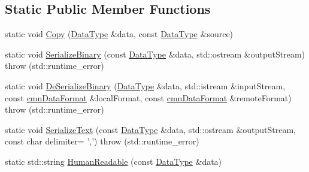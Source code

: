 \subsection*{Static Public Member Functions}
\begin{DoxyCompactItemize}
\item 
static void \hyperlink{classcmn_data_3_01vct_matrix_rotation3_3_01__element_type_00_01__row_major_01_4_01_4_ab8b28fb13fa4d47931f9d0d872275304}{Copy} (\hyperlink{classcmn_data_3_01vct_matrix_rotation3_3_01__element_type_00_01__row_major_01_4_01_4_a16ee28dba714864959664e5a1567db82}{Data\-Type} \&data, const \hyperlink{classcmn_data_3_01vct_matrix_rotation3_3_01__element_type_00_01__row_major_01_4_01_4_a16ee28dba714864959664e5a1567db82}{Data\-Type} \&source)
\item 
static void \hyperlink{classcmn_data_3_01vct_matrix_rotation3_3_01__element_type_00_01__row_major_01_4_01_4_a4e7912d305c127eeb3eab553b09a0c69}{Serialize\-Binary} (const \hyperlink{classcmn_data_3_01vct_matrix_rotation3_3_01__element_type_00_01__row_major_01_4_01_4_a16ee28dba714864959664e5a1567db82}{Data\-Type} \&data, std\-::ostream \&output\-Stream)  throw (std\-::runtime\-\_\-error)
\item 
static void \hyperlink{classcmn_data_3_01vct_matrix_rotation3_3_01__element_type_00_01__row_major_01_4_01_4_a61271fbc1aff20b4406ab77b0923acee}{De\-Serialize\-Binary} (\hyperlink{classcmn_data_3_01vct_matrix_rotation3_3_01__element_type_00_01__row_major_01_4_01_4_a16ee28dba714864959664e5a1567db82}{Data\-Type} \&data, std\-::istream \&input\-Stream, const \hyperlink{classcmn_data_format}{cmn\-Data\-Format} \&local\-Format, const \hyperlink{classcmn_data_format}{cmn\-Data\-Format} \&remote\-Format)  throw (std\-::runtime\-\_\-error)
\item 
static void \hyperlink{classcmn_data_3_01vct_matrix_rotation3_3_01__element_type_00_01__row_major_01_4_01_4_a943b3341e5f9e0449b758aa04522c5b5}{Serialize\-Text} (const \hyperlink{classcmn_data_3_01vct_matrix_rotation3_3_01__element_type_00_01__row_major_01_4_01_4_a16ee28dba714864959664e5a1567db82}{Data\-Type} \&data, std\-::ostream \&output\-Stream, const char delimiter= ',')  throw (std\-::runtime\-\_\-error)
\item 
static std\-::string \hyperlink{classcmn_data_3_01vct_matrix_rotation3_3_01__element_type_00_01__row_major_01_4_01_4_a0246b0ae35fd2c183f8104420a596426}{Human\-Readable} (const \hyperlink{classcmn_data_3_01vct_matrix_rotation3_3_01__element_type_00_01__row_major_01_4_01_4_a16ee28dba714864959664e5a1567db82}{Data\-Type} \&data)

\end{DoxyCompactItemize}
